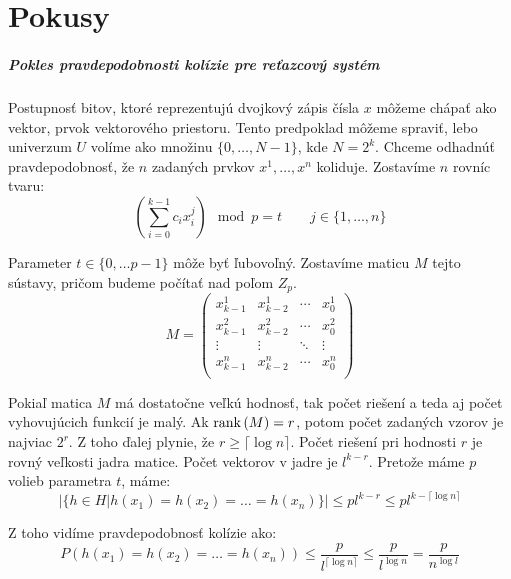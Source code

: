 \chapter{Pokusy}
\paragraph{Pokles pravdepodobnosti kolízie pre reťazcový systém}

Postupnosť bitov, ktoré reprezentujú dvojkový zápis čísla $x$ môžeme chápať ako vektor, prvok vektorového priestoru. Tento predpoklad môžeme spraviť, lebo univerzum $U$ volíme ako množinu $\{0, \dots, N - 1 \}$, kde $N = 2^k$. Chceme odhadnúť pravdepodobnosť, že $n$ zadaných prvkov $x^1, \dots, x^n$ koliduje. Zostavíme $n$ rovníc tvaru:
\begin{displaymath}
\left(\displaystyle \sum_{i=0}^{k-1} c_i x_i^j\right) \mod p = t \qquad j \in \{1, \dots, n\}
\end{displaymath}

Parameter $t \in \{0, \dots p-1\}$ môže byť ľubovoľný. Zostavíme maticu $M$ tejto sústavy, pričom budeme počítať nad poľom $Z_p$. 
\begin{displaymath}
M = \begin{pmatrix}
  x_{k-1}^1 & x_{k-2}^1 & \cdots & x_0^1  \\
  x_{k-1}^2 & x_{k-2}^2 & \cdots & x_0^2  \\
  \vdots  	& \vdots  	& \ddots & \vdots \\
  x_{k-1}^n & x_{k-2}^n & \cdots & x_0^n  \\
 \end{pmatrix}
\end{displaymath}

Pokiaľ matica $M$ má dostatočne veľkú hodnosť, tak počet riešení a teda aj počet vyhovujúcich funkcií je malý. Ak $\mathrm{rank}\left({M}\right) = r$, potom počet zadaných vzorov je najviac $2^r$. Z toho ďalej plynie, že $r \geq \lceil \log n \rceil$. Počet riešení pri hodnosti $r$ je rovný veľkosti jadra matice. Počet vektorov v jadre je $l^{k-r}$. Pretože máme $p$ volieb parametra $t$, máme:
\begin{displaymath}
|\{ h \in H | h(x_1) = h(x_2) = \dots = h(x_n) \}| \leq p l^{k-r} \leq p l^{k - \lceil \log n \rceil}
\end{displaymath}

Z toho vidíme pravdepodobnosť kolízie ako:
\begin{displaymath}
P(h(x_1) = h(x_2) = \dots = h(x_n)) \leq \frac{p}{l^{\lceil \log n \rceil}} \leq \frac{p}{l^{\log n}} = \frac{p}{n^{\log l}}
\end{displaymath}

